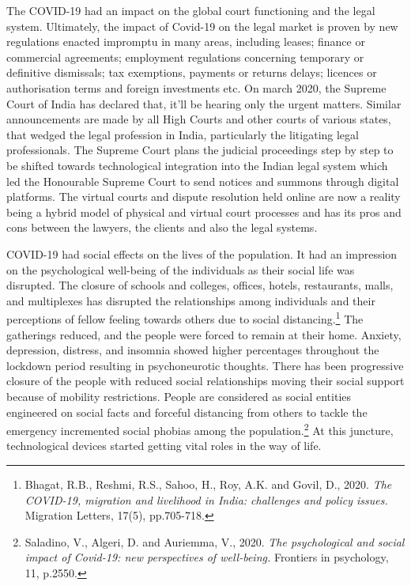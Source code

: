 \begin{multicols}{2}

\noi
The COVID-19 had an impact on the global court functioning and the legal system.
Ultimately, the impact of Covid-19 on the legal market is proven by new regulations enacted
impromptu in many areas, including leases; finance or commercial agreements; employment
regulations concerning temporary or definitive dismissals; tax exemptions, payments or
returns delays; licences or authorisation terms and foreign investments etc. On march 2020,
the Supreme Court of India has declared that, it'll be hearing only the urgent matters. Similar
announcements are made by all High Courts and other courts of various states, that wedged the legal profession in India, particularly the litigating legal professionals. The Supreme
Court plans the judicial proceedings step by step to be shifted towards technological
integration into the Indian legal system which led the Honourable Supreme Court to send
notices and summons through digital platforms. The virtual courts and dispute resolution held
online are now a reality being a hybrid model of physical and virtual court processes and has
its pros and cons between the lawyers, the clients and also the legal systems.


\noi
COVID-19 had social effects on the lives of the population. It had an impression on the
psychological well-being of the individuals as their social life was disrupted. The closure of
schools and colleges, offices, hotels, restaurants, malls, and multiplexes has disrupted the
relationships among individuals and their perceptions of fellow feeling towards others due to
social distancing.\footnote{Bhagat, R.B., Reshmi, R.S., Sahoo, H., Roy, A.K. and Govil, D., 2020. \textit{The COVID-19, migration and livelihood in India: challenges and policy issues.} Migration Letters, 17(5), pp.705-718.} The gatherings reduced, and the people were forced to remain at their
home. Anxiety, depression, distress, and insomnia showed higher percentages throughout the
lockdown period resulting in psychoneurotic thoughts. There has been progressive closure of
the people with reduced social relationships moving their social support because of mobility
restrictions. People are considered as social entities engineered on social facts and forceful
distancing from others to tackle the emergency incremented social phobias among the
population.\footnote{Saladino, V., Algeri, D. and Auriemma, V., 2020. \textit{The psychological and social impact of Covid-19: new perspectives of well-being.} Frontiers in psychology, 11, p.2550.} At this juncture, technological devices started getting vital roles in the way of
life.


\end{multicols}
